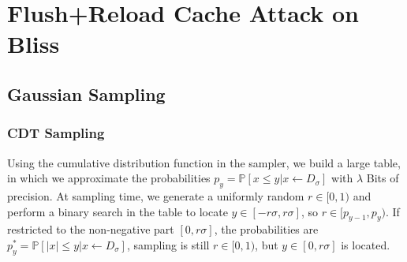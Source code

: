 %
%

\chapter{Flush+Reload Cache Attack on Bliss}
\label{bliss}

\section{Gaussian Sampling} %

\subsection{CDT Sampling}
Using the cumulative distribution function in the sampler, we build a large table, in which we approximate the probabilities $p_y=\mathbb{P}[x \le y| x \leftarrow D_\sigma ]$ with $\lambda$ Bits of precision. At sampling time, we generate a uniformly random $r \in [0,1)$ and perform a binary search in the table to locate $y \in [-r\sigma, r\sigma]$, so $r \in [p_{y-1}, p_y)$. If restricted to the non-negative part $[0, r\sigma]$, the probabilities are $p^*_y = \mathbb{P}[|x| \le y| x \leftarrow D_\sigma]$, sampling is still $r \in [0,1)$, but $y \in [0, r \sigma]$ is located. 

